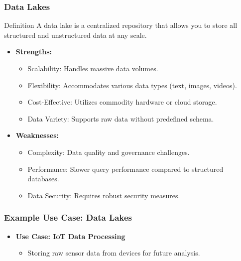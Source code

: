 \documentclass[aspectratio=169]{beamer}
\begin{document}
\begin{frame}[fragile]
    \frametitle{Data Lakes}
    \begin{block}{Definition}
        A data lake is a centralized repository that allows you to store all structured and unstructured data at any scale.
    \end{block}
    \begin{itemize}
        \item \textbf{Strengths:}
            \begin{itemize}
                \item Scalability: Handles massive data volumes.
                \item Flexibility: Accommodates various data types (text, images, videos).
                \item Cost-Effective: Utilizes commodity hardware or cloud storage.
                \item Data Variety: Supports raw data without predefined schema.
            \end{itemize}
        \item \textbf{Weaknesses:}
            \begin{itemize}
                \item Complexity: Data quality and governance challenges.
                \item Performance: Slower query performance compared to structured databases.
                \item Data Security: Requires robust security measures.
            \end{itemize}
    \end{itemize}
\end{frame}

\begin{frame}[fragile]
    \frametitle{Example Use Case: Data Lakes}
    \begin{itemize}
        \item \textbf{Use Case: IoT Data Processing}
            \begin{itemize}
                \item Storing raw sensor data from devices for future analysis.
            \end{itemize}
    \end{itemize}
\end{frame}
\end{document}
